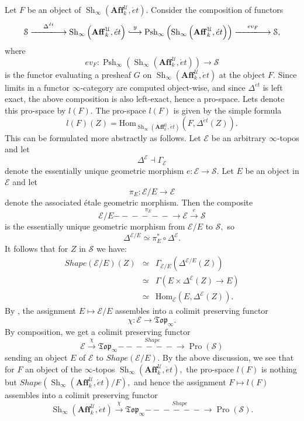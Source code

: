 \documentclass[12pt]{amsart}
\theoremstyle{definition}
\newcommand{\cE}{\mathcal{E}}
\newcommand{\cS}{\mathcal{S}}
\newcommand{\cU}{\mathcal{U}}
\newcommand{\Affku}{\mathbf{Aff}^{\cU}_{k}}
\newcommand{\Topi}{\mathfrak{Top}_\i}
\newcommand{\Sh}{\operatorname{Sh}}
\newcommand{\Hom}{\mathrm{Hom}}
\newcommand{\et}{\acute{e}t}
\renewcommand{\i}{\infty}
\def\Pro{\operatorname{Pro}}
\def\Pshi{\operatorname{Psh}_\i}
\def\Shi{\Sh_\i}
\def\Shape{\mathit{Shape}}
\def\longlongrightarrow{-\!\!\!-\!\!\!-\!\!\!-\!\!\!-\!\!\!-\!\!\!\longrightarrow}
\newcommand*{\longhookrightarrow}{\ensuremath{\lhook\joinrel\relbar\joinrel\rightarrow}}
\begin{document}
Let $F$ be an object of $\Shi\left(\Affku,\et\right).$ Consider the composition of functors
$$\cS \stackrel{\Delta^{\et}}{\longlongrightarrow} \Shi\left(\Affku,\et\right)
 \stackrel{y}{\longhookrightarrow} \Pshi\left(\Shi\left(\Affku,\et\right)\right) \stackrel{ev_F}{\longlongrightarrow} \cS,$$
 where $$ev_F: \Pshi\left(\Shi\left(\Affku,\et\right)\right) \to \cS$$ is the functor evaluating a presheaf $G$ on $\Shi\left(\Affku,\et\right)$ at the object $F.$ Since limits in a functor $\i$-category are computed object-wise, and since $\Delta^{\et}$ is left exact, the above composition is also left-exact, hence a pro-space. Lets denote this pro-space by $l\left(F\right).$ The pro-space $l\left(F\right)$ is given by the simple formula 
\begin{equation}\label{eq:el}
l\left(F\right)\left(Z\right)=\Hom_{\Shi\left(\Affku,\et\right)}\left(F,\Delta^{\et}\left(Z\right)\right).
\end{equation}
This can be formulated more abstractly as follows. Let $\cE$ be an arbitrary $\i$-topos and let $$\Delta^{\cE} \dashv \Gamma_{\cE}$$ denote the essentially unique geometric morphism $e:\cE \to \cS.$ Let $E$ be an object in $\cE$ and let $$\pi_E:\cE/E \to \cE$$ denote the associated \'etale geometric morphism. Then the composite $$\cE/E \stackrel{\pi_E}{\longlongrightarrow} \cE \stackrel{e}{\longrightarrow} \cS$$ is the essentially unique geometric morphism from $\cE/E$ to $\cS,$ so $$\Delta^{\cE/E}\simeq\pi_{E}^*  \circ \Delta^{\cE}.$$ It follows that for $Z$ in $\cS$ we have:
 \begin{eqnarray*}
 \Shape\left(\cE/E\right)\left(Z\right)&\simeq&\Gamma_{\cE/E}\left(\Delta^{\cE/E}\left(Z\right)\right)\\
 &\simeq& \Gamma\left(E \times \Delta^{\cE}\left(Z\right) \to E\right)\\
 &\simeq& \Hom_{\cE}\left(E,\Delta^{\cE}\left(Z\right)\right).
 \end{eqnarray*}
 By \cite[Proposition 6.3.5.14]{htt}, the assignment $E \mapsto \cE/E$ assembles into a colimit preserving functor $$\chi:\cE \to \Topi.$$ By composition, we get a colimit preserving functor $$\cE \stackrel{\chi}{\longrightarrow} \Topi \stackrel{\Shape}{\longlongrightarrow} \Pro\left(\cS\right)$$ sending an object $E$ of $\cE$ to $\Shape\left(\cE/E\right).$ By the above discussion, we see that for $F$ an object of the $\i$-topos $\Shi\left(\Affku,\et\right),$ the pro-space $l\left(F\right)$ is nothing but $\Shape\left(\Shi\left(\Affku,\et\right)/F\right),$ and hence the assignment $F \mapsto l\left(F\right)$ assembles into a colimit preserving functor $$\Shi\left(\Affku,\et\right) \stackrel{\chi}{\longrightarrow} \Topi \stackrel{\Shape}{\longlongrightarrow} \Pro\left(\cS\right).$$
 
\end{document}
